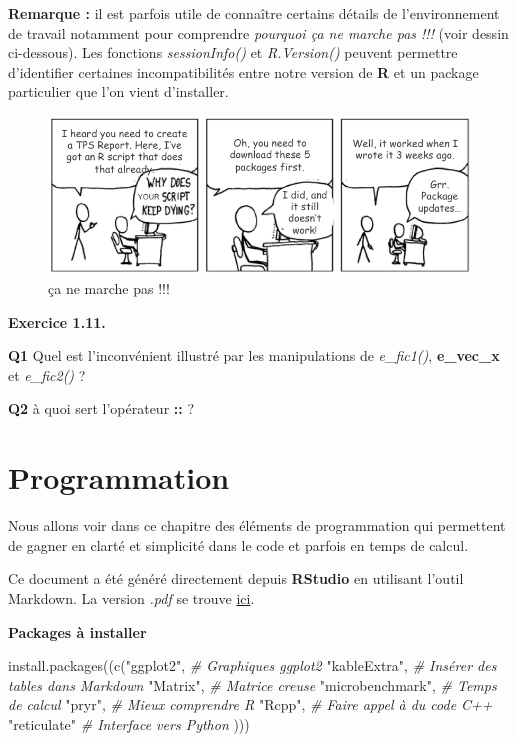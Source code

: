 \documentclass[
]{book}
\newenvironment{Shaded}{\begin{snugshade}}{\end{snugshade}}
\newcommand{\CommentTok}[1]{\textcolor[rgb]{0.56,0.35,0.01}{\textit{#1}}}
\newcommand{\FunctionTok}[1]{\textcolor[rgb]{0.00,0.00,0.00}{#1}}
\newcommand{\NormalTok}[1]{#1}
\newcommand{\StringTok}[1]{\textcolor[rgb]{0.31,0.60,0.02}{#1}}
\theoremstyle{definition}
\theoremstyle{definition}
\theoremstyle{definition}
\theoremstyle{definition}
\theoremstyle{remark}
\begin{document}
\textbf{Remarque :} il est parfois utile de connaître certains détails de l'environnement de travail notamment pour comprendre \emph{pourquoi ça ne marche pas !!!} (voir dessin ci-dessous). Les fonctions \emph{sessionInfo()} et \emph{R.Version()} peuvent permettre d'identifier certaines incompatibilités entre notre version de \textbf{R} et un package particulier que l'on vient d'installer.

\begin{figure}
\centering
\includegraphics{Figures/version.png}
\caption{ça ne marche pas !!!}
\end{figure}

\textbf{Exercice 1.11.}

\textbf{Q1} Quel est l'inconvénient illustré par les manipulations de \emph{e\_fic1()}, \textbf{e\_vec\_x} et \emph{e\_fic2()} ?

\textbf{Q2} à quoi sert l'opérateur \textbf{::} ?

\hypertarget{programmation}{%
\chapter{Programmation}\label{programmation}}

Nous allons voir dans ce chapitre des éléments de programmation qui permettent de gagner en clarté et simplicité dans le code et parfois en temps de calcul.

Ce document a été généré directement depuis \textbf{RStudio} en utilisant l'outil Markdown. La version \emph{.pdf} se trouve \href{chapitre_2_avance.pdf}{ici}.

\textbf{Packages à installer}

\begin{Shaded}
\begin{Highlighting}[]
\FunctionTok{install.packages}\NormalTok{((}\FunctionTok{c}\NormalTok{(}\StringTok{"ggplot2"}\NormalTok{, }\CommentTok{\# Graphiques ggplot2}
                    \StringTok{"kableExtra"}\NormalTok{, }\CommentTok{\# Insérer des tables dans Markdown}
                    \StringTok{"Matrix"}\NormalTok{, }\CommentTok{\# Matrice creuse}
                    \StringTok{"microbenchmark"}\NormalTok{, }\CommentTok{\# Temps de calcul}
                    \StringTok{"pryr"}\NormalTok{, }\CommentTok{\# Mieux comprendre R}
                    \StringTok{"Rcpp"}\NormalTok{, }\CommentTok{\# Faire appel à du code C++}
                    \StringTok{"reticulate"} \CommentTok{\# Interface vers Python}
\NormalTok{                    )))}
\end{Highlighting}
\end{Shaded}
\end{document}
